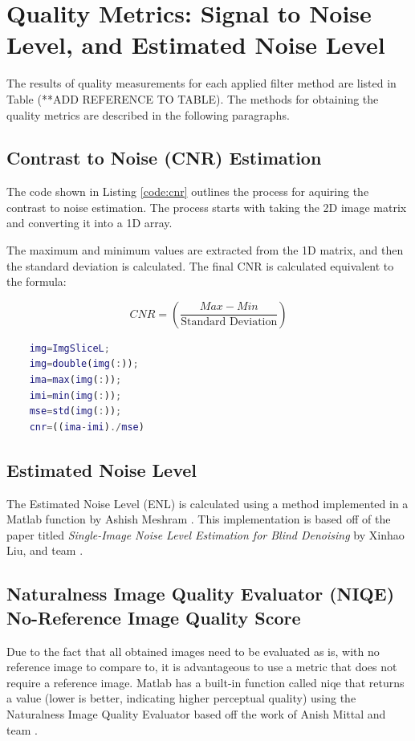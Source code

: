 \documentclass{article}
\begin{document}
	\section{\label{sec:level1} Quality Metrics: Signal to Noise Level, and Estimated Noise Level}
	The results of quality measurements for each applied filter method are listed in Table (**ADD REFERENCE TO TABLE). The methods for obtaining the quality metrics are described in the following paragraphs.

	\subsection{\label{sec:level2} Contrast to Noise (CNR) Estimation}
	The code shown in Listing \ref{code:cnr} outlines the process for aquiring the contrast to noise estimation. The process starts with taking the 2D image matrix and converting it into a 1D array.

	The maximum and minimum values are extracted from the 1D matrix, and then the standard deviation is calculated. The final CNR is calculated equivalent to the formula:

	$$CNR = (\frac{Max-Min}{\text{Standard Deviation}})$$

	\begin{lstlisting}[language=Matlab, caption=Estimate Contrast to Noise Ratio, label=code:cnr]
	% Measure contrast-to-noise ratio
	img=ImgSliceL;
	img=double(img(:));
	ima=max(img(:));
	imi=min(img(:));
	mse=std(img(:));
	cnr=((ima-imi)./mse)
	\end{lstlisting}

	\subsection{\label{sec:level2} Estimated Noise Level}
	The Estimated Noise Level (ENL) is calculated using a method implemented in a Matlab function by Ashish Meshram \cite{meshram_noise_2014}. This implementation is based off of the paper titled \textit{Single-Image Noise Level Estimation for Blind Denoising}  by Xinhao Liu, and team \cite{Liu_2013}.
	\subsection{\label{sec:level2} Naturalness Image Quality Evaluator (NIQE) No-Reference Image Quality Score}

	Due to the fact that all obtained images need to be evaluated as is, with no reference image to compare to, it is advantageous to use a metric that does not require a reference image. Matlab has a built-in function called niqe that returns a value (lower is better, indicating higher perceptual quality) using the Naturalness Image Quality Evaluator based off the work of Anish Mittal and team \cite{NIQE_2013}.
\end{document}
